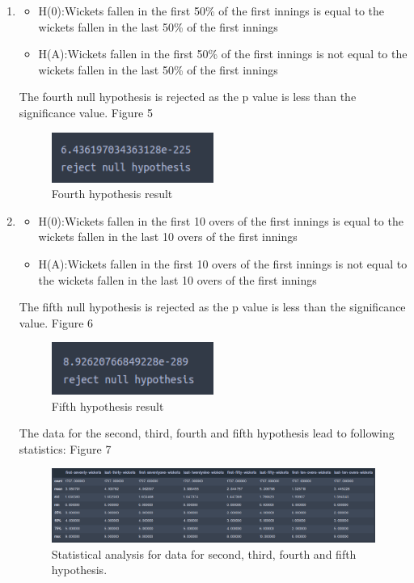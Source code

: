 \documentclass[fleqn,10pt]{wlscirep}
\begin{document}
\begin{enumerate}
\item
\begin{itemize}
    \item H(0):Wickets fallen in the first 50\% of the first innings is equal to the wickets fallen in the last 50\% of the first innings
    \item H(A):Wickets fallen in the first 50\% of the first innings is not equal to the wickets fallen in the last 50\% of the first innings
\end{itemize}
The fourth null hypothesis is rejected as the p value is less than the significance value. Figure 5
\begin{figure}[h!]
    \centering
    \includegraphics[width=0.5\textwidth]{secondthird.png}
    \caption{Fourth hypothesis result}
  \end{figure}

\item
\begin{itemize}
    \item H(0):Wickets fallen in the first 10 overs of the first innings is equal to the wickets fallen in the last 10 overs of the first innings
    \item H(A):Wickets fallen in the first 10 overs of the first innings is not equal to the wickets fallen in the last 10 overs of the first innings
\end{itemize}

The fifth null hypothesis is rejected as the p value is less than the significance value. Figure 6
\begin{figure}[h!]
    \centering
    \includegraphics[width=0.5\textwidth]{secondfourth.png}
    \caption{Fifth hypothesis result}
  \end{figure}

  The data for the second, third, fourth and fifth hypothesis lead to following statistics: Figure 7
\begin{figure}[h!]
    \centering
    \includegraphics[width=1\textwidth]{second.png}
    \caption{Statistical analysis for data for second, third, fourth and fifth hypothesis.}
  \end{figure}


\end{enumerate}
\end{document}
